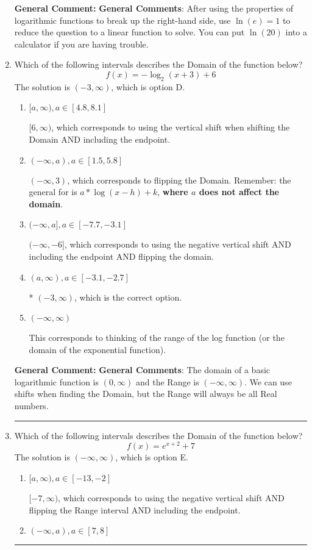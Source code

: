 \documentclass{extbook}[14pt]
\newcommand{\litem}[1]{\item #1

\rule{\textwidth}{0.4pt}}
\begin{document}
\begin{enumerate}
{\textbf{General Comment:} \textbf{General Comments}: After using the properties of logarithmic functions to break up the right-hand side, use $\ln(e) = 1$ to reduce the question to a linear function to solve. You can put $\ln(20)$ into a calculator if you are having trouble.
}
\litem{
Which of the following intervals describes the Domain of the function below?
\[ f(x) = -\log_2{(x+3)}+6 \]The solution is \( (-3, \infty) \), which is option D.\begin{enumerate}[label=\Alph*.]
\item \( [a, \infty), a \in [4.8, 8.1] \)

$[6, \infty)$, which corresponds to using the vertical shift when shifting the Domain AND including the endpoint.
\item \( (-\infty, a), a \in [1.5, 5.8] \)

$(-\infty, 3)$, which corresponds to flipping the Domain. Remember: the general for is $a*\log(x-h)+k$, \textbf{where $a$ does not affect the domain}.
\item \( (-\infty, a], a \in [-7.7, -3.1] \)

$(-\infty, -6]$, which corresponds to using the negative vertical shift AND including the endpoint AND flipping the domain.
\item \( (a, \infty), a \in [-3.1, -2.7] \)

* $(-3, \infty)$, which is the correct option.
\item \( (-\infty, \infty) \)

This corresponds to thinking of the range of the log function (or the domain of the exponential function).
\end{enumerate}

\textbf{General Comment:} \textbf{General Comments}: The domain of a basic logarithmic function is $(0, \infty)$ and the Range is $(-\infty, \infty)$. We can use shifts when finding the Domain, but the Range will always be all Real numbers.
}
\litem{
Which of the following intervals describes the Domain of the function below?
\[ f(x) = e^{x+2}+7 \]The solution is \( (-\infty, \infty) \), which is option E.\begin{enumerate}[label=\Alph*.]
\item \( [a, \infty), a \in [-13, -2] \)

$[-7, \infty)$, which corresponds to using the negative vertical shift AND flipping the Range interval AND including the endpoint.
\item \( (-\infty, a), a \in [7, 8] \)


\end{enumerate}}
\end{enumerate}
\end{document}
